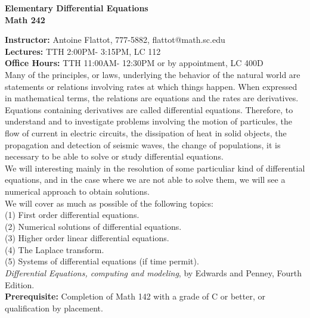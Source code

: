 \documentclass[11pt]{amsart}
\begin{document}
\thispagestyle{empty}
\begin{center}
\Large{\bf Elementary Differential Equations \\ Math 242}
\end{center}
\vspace*{0.8cm}
\large{{\bf Instructor:} Antoine Flattot, 777-5882, flattot@math.sc.edu}\\
\large{{\bf Lectures:} TTH 2:00PM- 3:15PM, LC 112}\\
\large{{\bf Office Hours:} TTH 11:00AM- 12:30PM or by appointment, LC 400D}\\[0.8cm]
 Many of the principles, or laws, underlying the behavior of the natural world
are statements or relations involving rates at which things happen. When expressed in mathematical
terms, the relations are equations and the rates are derivatives. Equations containing derivatives are
called differential equations. Therefore, to understand and to investigate problems involving the 
motion of particules, the flow of current in electric circuits, the dissipation of heat in solid objects,
the propagation and detection of seismic waves, the change of populations, it is necessary to 
be able to solve or study differential equations.\\
We will interesting mainly in the resolution of some particuliar kind of differential equations, and in the case where we are not able to solve them, we will see a numerical approach to obtain solutions.\\[0.3cm] 
 We will cover as much as possible of the following topics:\\
\hspace*{0.3cm} (1) First order differential equations.\\
\hspace*{0.3cm} (2) Numerical solutions of differential equations.\\
\hspace*{0.3cm} (3) Higher order linear differential equations.\\
\hspace*{0.3cm} (4) The Laplace transform.\\
\hspace*{0.3cm} (5) Systems of differential equations (if time permit).\\[0.3cm]
 {\em Differential Equations, computing and modeling}, by Edwards and Penney,
Fourth Edition.\\[0.3cm]
{\bf Prerequisite:} Completion of Math 142 with a grade of C or better, or qualification by placement.\\[0.3cm]
\end{document}
